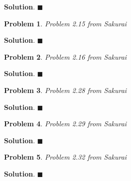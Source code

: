 \documentclass[12pt]{article}
\newtheorem{p}{Problem}
\theoremstyle{definition}
\newenvironment{s}{%
        \begin{trivlist} \item \textbf{Solution}. }{%
            \hspace*{\fill} $\blacksquare$\end{trivlist}}%
\begin{document}
{\begin{s}
\end{s}

\begin{p}
Problem 2.15 from Sakurai
\end{p}

\begin{s}
\end{s}

\begin{p}
Problem 2.16 from Sakurai
\end{p}

\begin{s}
\end{s}

\begin{p}
Problem 2.28 from Sakurai
\end{p}

\begin{s}
\end{s}

\begin{p}
Problem 2.29 from Sakurai
\end{p}

\begin{s}
\end{s}

\begin{p}
Problem 2.32 from Sakurai
\end{p}

\begin{s}
\end{s}
\end{document}
